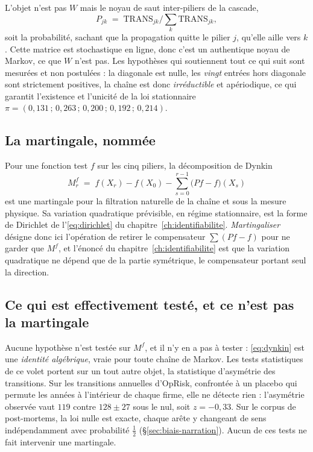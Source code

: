 L'objet n'est pas $W$ mais le noyau de saut inter-piliers de la cascade,
\[
  P_{jk} \;=\; \mathrm{TRANS}_{jk} \Big/ \sum_{k}\mathrm{TRANS}_{jk},
\]
soit la probabilité, sachant que la propagation quitte le pilier $j$, qu'elle aille vers $k$. Cette matrice est stochastique en
ligne, donc c'est un authentique noyau de Markov, ce que $W$ n'est pas. Les hypothèses qui
soutiennent tout ce qui suit sont mesurées et non postulées : la diagonale est nulle, les
\emph{vingt} entrées hors diagonale sont strictement positives, la chaîne est donc
\emph{irréductible} et apériodique, ce qui garantit l'existence et l'unicité de la loi
stationnaire $\pi = (0{,}131\,;\,0{,}263\,;\,0{,}200\,;\,0{,}192\,;\,0{,}214)$.

\subsection*{La martingale, nommée}

Pour une fonction test $f$ sur les cinq piliers, la décomposition de Dynkin
\begin{equation}
  M^f_r \;=\; f(X_r) - f(X_0) - \sum_{s=0}^{r-1}\bigl(Pf - f\bigr)(X_s)
  \label{eq:dynkin}
\end{equation}
est une martingale pour la filtration naturelle de la chaîne et sous la mesure
physique. Sa variation quadratique prévisible, en régime stationnaire, est la forme de Dirichlet
de l'\eqref{eq:dirichlet} du chapitre~\ref{ch:identifiabilite}. \emph{Martingaliser} désigne donc ici l'opération de
retirer le compensateur $\sum(Pf-f)$ pour ne garder que $M^f$, et l'énoncé du
chapitre~\ref{ch:identifiabilite} est que la variation quadratique ne dépend que de la partie
symétrique, le compensateur portant seul la direction.

\subsection*{Ce qui est effectivement testé, et ce n'est pas la martingale}

Aucune hypothèse n'est testée sur $M^f$, et il n'y en a pas à tester : \eqref{eq:dynkin} est une
\emph{identité algébrique}, vraie pour toute chaîne de Markov. Les tests statistiques de ce
volet portent sur un tout autre objet, la statistique d'asymétrie des transitions. Sur les
transitions annuelles d'OpRisk, confrontée à un placebo qui permute les années à l'intérieur de
chaque firme, elle ne détecte rien : l'asymétrie observée vaut $119$ contre $128 \pm 27$ sous le
nul, soit $z = -0{,}33$. Sur le corpus de post-mortems, la loi nulle est exacte, chaque arête y
changeant de sens indépendamment avec probabilité $\tfrac12$ (\S\ref{sec:biais-narration}). Aucun
de ces tests ne fait intervenir une martingale.

